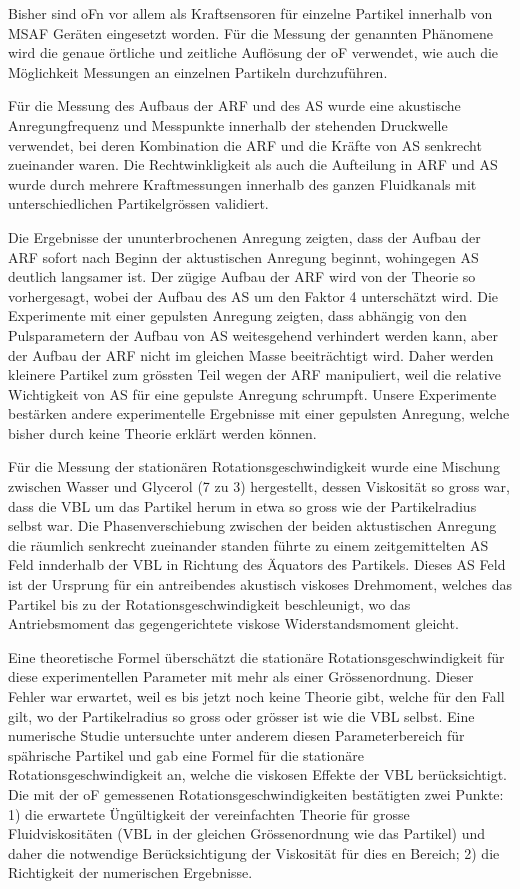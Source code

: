 Bisher sind oFn vor allem als Kraftsensoren für einzelne Partikel innerhalb von 
MSAF Geräten eingesetzt worden. Für die Messung der genannten Phänomene wird 
die genaue örtliche und zeitliche Auflösung der oF verwendet, wie auch die 
Möglichkeit Messungen an einzelnen Partikeln durchzuführen.

Für die Messung des Aufbaus der ARF und des AS wurde eine akustische 
Anregungfrequenz und Messpunkte innerhalb der stehenden Druckwelle verwendet, 
bei deren Kombination die ARF und die Kräfte von AS senkrecht zueinander waren. 
Die Rechtwinkligkeit als auch die Aufteilung in ARF und AS wurde durch mehrere 
Kraftmessungen innerhalb des ganzen Fluidkanals mit unterschiedlichen 
Partikelgrössen validiert.

Die Ergebnisse der ununterbrochenen Anregung zeigten, dass der Aufbau der ARF 
sofort nach Beginn der aktustischen Anregung beginnt, wohingegen AS deutlich 
langsamer ist. Der zügige Aufbau der ARF wird von der Theorie so vorhergesagt, 
wobei der Aufbau des AS um den Faktor 4 unterschätzt wird. Die Experimente mit 
einer gepulsten Anregung zeigten, dass abhängig von den Pulsparametern der 
Aufbau von AS weitesgehend verhindert werden kann, aber der Aufbau der ARF 
nicht im gleichen Masse beeiträchtigt wird. Daher werden kleinere Partikel zum 
grössten Teil wegen der ARF manipuliert, weil die relative Wichtigkeit von AS 
für eine gepulste Anregung schrumpft. Unsere Experimente bestärken andere 
experimentelle Ergebnisse mit einer gepulsten Anregung, welche bisher durch 
keine Theorie erklärt werden können.

Für die Messung der stationären Rotationsgeschwindigkeit wurde eine Mischung 
zwischen Wasser und Glycerol (7 zu 3) hergestellt, dessen Viskosität so gross 
war, dass die VBL um das Partikel herum in etwa so gross wie der Partikelradius 
selbst war. Die Phasenverschiebung zwischen der beiden aktustischen Anregung 
die räumlich senkrecht zueinander standen führte zu einem zeitgemittelten AS 
Feld innderhalb der VBL in Richtung des Äquators des Partikels. Dieses AS Feld 
ist der Ursprung für ein antreibendes akustisch viskoses Drehmoment, welches 
das Partikel bis zu der Rotationsgeschwindigkeit beschleunigt, wo das 
Antriebsmoment das gegengerichtete viskose Widerstandsmoment gleicht.

Eine theoretische Formel überschätzt die stationäre Rotationsgeschwindigkeit 
für diese experimentellen Parameter mit mehr als einer Grössenordnung. Dieser 
Fehler war erwartet, weil es bis jetzt noch keine Theorie gibt, welche für den 
Fall gilt, wo der Partikelradius so gross oder grösser ist wie die VBL selbst. 
Eine numerische Studie untersuchte unter anderem diesen Parameterbereich für 
spährische Partikel und gab eine Formel für die stationäre 
Rotationsgeschwindigkeit an, welche die viskosen Effekte der VBL 
berücksichtigt. Die mit der oF gemessenen Rotationsgeschwindigkeiten 
bestätigten zwei Punkte: 1) die erwartete Üngültigkeit der vereinfachten 
Theorie für grosse Fluidviskositäten (VBL in der gleichen Grössenordnung wie 
das Partikel) und daher die notwendige Berücksichtigung der Viskosität für dies 
en Bereich; 2) die Richtigkeit der numerischen Ergebnisse.
